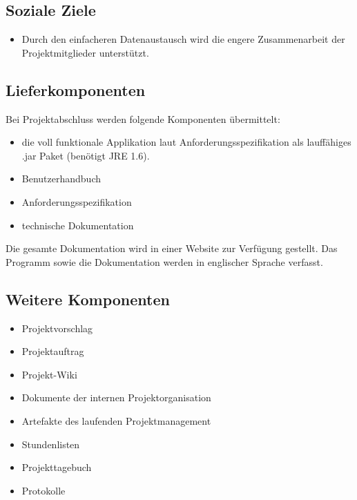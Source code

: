 \subsection{Soziale Ziele}
\begin{itemize}
\item Durch den einfacheren Datenaustausch wird die engere Zusammenarbeit der Projektmitglieder unterstützt.
\end{itemize}

\subsection{Lieferkomponenten}
Bei Projektabschluss werden folgende Komponenten übermittelt:
\begin{itemize}
\item die voll funktionale Applikation laut Anforderungsspezifikation als lauffähiges .jar Paket (benötigt JRE 1.6).
\item Benutzerhandbuch
\item Anforderungsspezifikation
\item technische Dokumentation
\end{itemize}

Die gesamte Dokumentation wird in einer Website zur Verfügung gestellt. Das Programm sowie die Dokumentation werden in englischer Sprache verfasst.

\subsection{Weitere Komponenten}
\begin{itemize}
\item Projektvorschlag
\item Projektauftrag
\item Projekt-Wiki
\item Dokumente der internen Projektorganisation
\item Artefakte des laufenden Projektmanagement
\item Stundenlisten
\item Projekttagebuch
\item Protokolle
\end{itemize}
